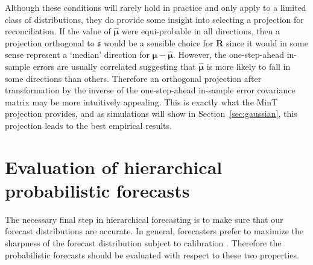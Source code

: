 \documentclass[12pt]{article}
\theoremstyle{definition}
\begin{document}
Although these conditions will rarely hold in practice and only apply to a limited class of distributions, they do provide some insight into selecting a projection for reconciliation. If the value of $\hat{\bm{\mu}}$ were equi-probable in all directions, then a projection orthogonal to $\mathfrak{s}$ would be a sensible choice for $\bm{R}$ since it would in some sense represent a `median' direction for $\bm{\mu}-\hat{\bm{\mu}}$. However, the one-step-ahead in-sample errors are usually correlated suggesting that $\hat{\bm{\mu}}$ is more likely to fall in some directions than others. Therefore an orthogonal projection after transformation by the inverse of the one-step-ahead in-sample error covariance matrix may be more intuitively appealing. This is exactly what the MinT projection provides, and as simulations will show in Section~\ref{sec:gaussian}, this projection leads to the best empirical results.


\section{Evaluation of hierarchical probabilistic forecasts}\label{sec:evaluation}

The necessary final step in hierarchical forecasting is to make sure that our forecast distributions are accurate. In general, forecasters prefer to maximize the sharpness of the forecast distribution subject to calibration \citep{Gneiting2014}. Therefore the probabilistic forecasts should be evaluated with respect to these two properties.
\end{document}
